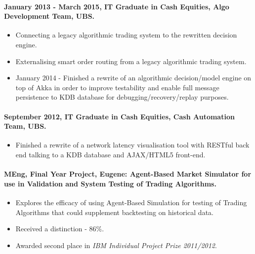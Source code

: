 \documentclass[11pt, a4paper]{article}
\newlength{\wideitemsep}
\let\olditem\item
\renewcommand{\item}{\setlength{\itemsep}{\wideitemsep}\olditem}
\begin{document}

\paragraph{January 2013 - March 2015, IT Graduate in Cash Equities, Algo Development Team, UBS.}
\begin{itemize}
\item Connecting a legacy algorithmic trading system to the rewritten decision engine.
\item Externalising smart order routing from a legacy algorithmic trading system.
\item January 2014 - Finished a rewrite of an algorithmic decision/model engine on top of Akka in order to improve testability and enable full message persistence to KDB database for debugging/recovery/replay purposes. 
\end{itemize}

\paragraph{September 2012, IT Graduate in Cash Equities, Cash Automation Team, UBS.}
\begin{itemize}
\item Finished a rewrite of a network latency visualisation tool with RESTful back end talking to a KDB database and AJAX/HTML5 front-end.  
\end{itemize}

\paragraph{MEng, Final Year Project, Eugene: Agent-Based Market Simulator for use in Validation and System Testing of Trading Algorithms.} 
\begin{itemize}
\item Explores the efficacy of using Agent-Based Simulation for testing of Trading Algorithms that could supplement backtesting on historical data.
\item Received a distinction - 86\%.
\item Awarded second place in \textit{IBM Individual Project Prize 2011/2012}.
\end{itemize}
\end{document}
